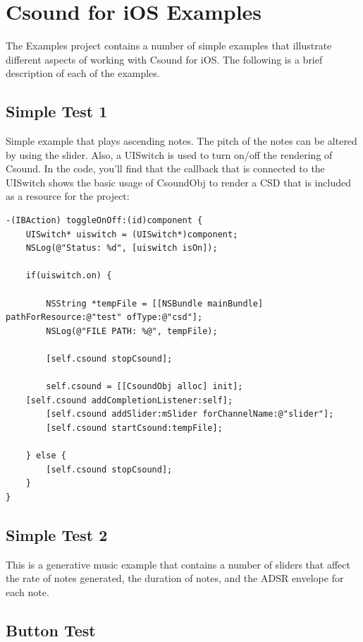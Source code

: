 \documentclass[11pt]{article}
\begin{document}
\section{Csound for iOS Examples}

The Examples project contains a number of simple examples that illustrate different aspects of working with Csound for iOS.  The following is a brief description of each of the examples.

\subsection{Simple Test 1}

Simple example that plays ascending notes.  The pitch of the notes can be altered by using the slider.  Also, a UISwitch is used to turn on/off the rendering of Csound.  In the code, you'll find that the callback that is connected to the UISwitch shows the basic usage of CsoundObj to render a CSD that is included as a resource for the project:

\begin{lstlisting}[caption=Example code showing configuring and starting a CsoundObj]
-(IBAction) toggleOnOff:(id)component {
    UISwitch* uiswitch = (UISwitch*)component;
    NSLog(@"Status: %d", [uiswitch isOn]);
    
    if(uiswitch.on) {
      
        NSString *tempFile = [[NSBundle mainBundle] pathForResource:@"test" ofType:@"csd"];  
        NSLog(@"FILE PATH: %@", tempFile);
        
        [self.csound stopCsound];
        
        self.csound = [[CsoundObj alloc] init];
    [self.csound addCompletionListener:self];
        [self.csound addSlider:mSlider forChannelName:@"slider"];
        [self.csound startCsound:tempFile];
        
    } else {
        [self.csound stopCsound];
    }
}
\end{lstlisting}

\subsection{Simple Test 2}

This is a generative music example that contains a number of sliders that affect the rate of notes generated, the duration of notes, and the ADSR envelope for each note. 


\subsection{Button Test}
\end{document}
